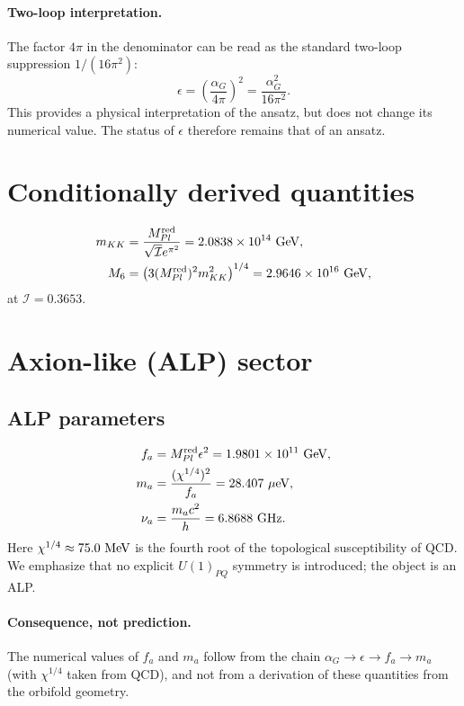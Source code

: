 \documentclass[12pt,a4paper]{article}
\numberwithin{equation}{section}
\begin{document}
\paragraph{Two-loop interpretation.}
The factor \(4\pi\) in the denominator can be read as the standard two-loop suppression \(1/(16\pi^2)\):
\begin{equation}
\epsilon = \left(\frac{\alpha_G}{4\pi}\right)^2 = \frac{\alpha_G^2}{16\pi^2}.
\end{equation}
This provides a physical interpretation of the ansatz, but does not change its numerical value. The status of \(\epsilon\) therefore remains that of an ansatz.

\section{Conditionally derived quantities}
\begin{align}
m_{KK} &= \frac{M_{Pl}^{\rm red}}{\sqrt{\mathcal{I}}e^{\pi^2}} = 2.0838\times 10^{14}~{\rm GeV}, \\
M_6 &= \left(3(M_{Pl}^{\rm red})^2 m_{KK}^2\right)^{1/4} = 2.9646\times 10^{16}~{\rm GeV},
\end{align}
at \(\mathcal{I} = 0.3653\).

\section{Axion-like (ALP) sector}
\subsection{ALP parameters}
\begin{align}
f_a &= M_{Pl}^{\rm red}\epsilon^2 = 1.9801\times 10^{11}~{\rm GeV}, \\
m_a &= \frac{(\chi^{1/4})^2}{f_a} = 28.407~\mu{\rm eV}, \\
\nu_a &= \frac{m_a c^2}{h} = 6.8688~{\rm GHz}.
\end{align}
Here \(\chi^{1/4}\approx 75.0~{\rm MeV}\) is the fourth root of the topological susceptibility of QCD. We emphasize that no explicit \(U(1)_{PQ}\) symmetry is introduced; the object is an ALP.

\paragraph{Consequence, not prediction.}
The numerical values of \(f_a\) and \(m_a\) follow from the chain \(\alpha_G\to \epsilon \to f_a\to m_a\) (with \(\chi^{1/4}\) taken from QCD), and not from a derivation of these quantities from the orbifold geometry.
\end{document}
